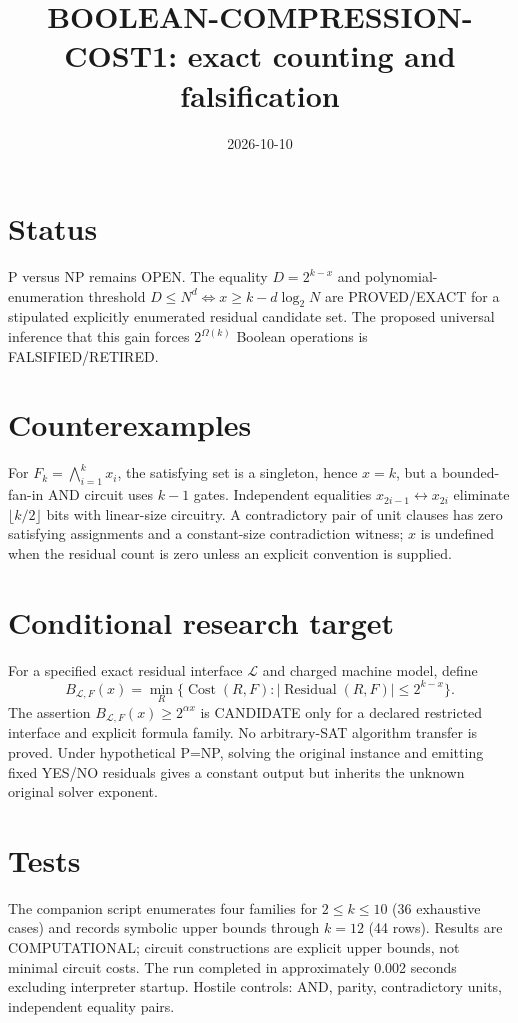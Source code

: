 \documentclass{article}
\begin{document}
\title{BOOLEAN-COMPRESSION-COST1: exact counting and falsification}
\date{2026-10-10}\maketitle
\section*{Status}
P versus NP remains OPEN. The equality $D=2^{k-x}$ and polynomial-enumeration threshold $D\le N^d\iff x\ge k-d\log_2N$ are PROVED/EXACT for a stipulated explicitly enumerated residual candidate set. The proposed universal inference that this gain forces $2^{\Omega(k)}$ Boolean operations is FALSIFIED/RETIRED.
\section*{Counterexamples}
For $F_k=\bigwedge_{i=1}^k x_i$, the satisfying set is a singleton, hence $x=k$, but a bounded-fan-in AND circuit uses $k-1$ gates. Independent equalities $x_{2i-1}\leftrightarrow x_{2i}$ eliminate $\lfloor k/2\rfloor$ bits with linear-size circuitry. A contradictory pair of unit clauses has zero satisfying assignments and a constant-size contradiction witness; $x$ is undefined when the residual count is zero unless an explicit convention is supplied.
\section*{Conditional research target}
For a specified exact residual interface $\mathcal L$ and charged machine model, define
\[
B_{\mathcal L,F}(x)=\min_{R}\{\operatorname{Cost}(R,F):|\operatorname{Residual}(R,F)|\le2^{k-x}\}.
\]
The assertion $B_{\mathcal L,F}(x)\ge2^{\alpha x}$ is CANDIDATE only for a declared restricted interface and explicit formula family. No arbitrary-SAT algorithm transfer is proved. Under hypothetical P=NP, solving the original instance and emitting fixed YES/NO residuals gives a constant output but inherits the unknown original solver exponent.
\section*{Tests}
The companion script enumerates four families for $2\le k\le10$ (36 exhaustive cases) and records symbolic upper bounds through $k=12$ (44 rows). Results are COMPUTATIONAL; circuit constructions are explicit upper bounds, not minimal circuit costs. The run completed in approximately 0.002 seconds excluding interpreter startup. Hostile controls: AND, parity, contradictory units, independent equality pairs.
\end{document}
